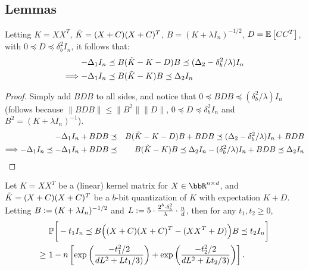 \documentclass[12pt]{article}
\begin{document}
\subsection{Lemmas}
\begin{lemma}
	\label{lem1}
	Letting $K=XX^T$, $\tK = (X+C)(X+C)^T$, $B = (K+\lambda I_n)^{-1/2}$, $D = \expect{}{CC^T}$, with $0 \preceq D \preceq \delta_b^2 I_n$, it follows that:
	\begin{align*}
-\Delta_1 I_n &\preceq B (\tK - K - D) B \preceq
(\Delta_2 - \delta^2_b/\lambda) I_n \\
\Longrightarrow -\Delta_1 I_n &\preceq B (\tK - K) B \preceq
\Delta_2 I_n
	\end{align*}
\end{lemma}
\begin{proof}
Simply add $BDB$ to all sides, and notice that $0 \preceq BDB \preceq (\delta_b^2/\lambda) I_n$ (follows because $\|BDB\| \leq \|B^2\| \|D\|$, $0 \preceq D \preceq \delta_b^2 I_n$ and $B^2 = (K+\lambda I_n)^{-1}$).
\begin{eqnarray*}
-\Delta_1 I_n + BDB &\preceq& B (\tK - K - D) B  + BDB \preceq
(\Delta_2 - \delta^2_b/\lambda) I_n  + BDB \\
\Longrightarrow -\Delta_1 I_n \preceq  -\Delta_1 I_n + BDB &\preceq& B (\tK - K) B \preceq
\Delta_2 I_n - (\delta_b^2/\lambda) I_n  + BDB \preceq \Delta_2 I_n
\end{eqnarray*}
\end{proof}


\begin{lemma}
	Let $K=XX^T$ be a (linear) kernel matrix for $X \in\RR^{n \times d}$, and $\tK = (X+C)(X+C)^T$ be a $b$-bit quantization of $K$ with expectation $K+D$.
	Letting $B\defeq (K+\lambda I_n)^{-1/2}$ and $L \defeq 5 \cdot \frac{2^b \cdot \delta_b^2}{\lambda}\cdot  \frac{n}{d}$, then for any $t_1, t_2 \geq 0$,
	\begin{align*}
	&\Prob\bigg[- t_1 I_n \preceq B\Big((X + C)(X + C)^T - (XX^T+D)\Big)B \preceq t_2 I_n\bigg] \\
	\geq\ &1 - n \left[ \exp \left( \frac{-t_1^2/2}{dL^2 +
		Lt_1/3)} \right) + \exp \left(\frac{-t_2^2/2}{dL^2 + Lt_2/3)} \right)  \right].
	\end{align*}
	\label{lem:quantized_concentration_two_sided}
\end{lemma}
\end{document}
